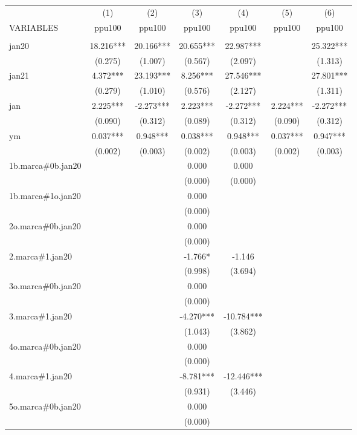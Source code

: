 \begin{tabular}{lcccccc} \hline
 & (1) & (2) & (3) & (4) & (5) & (6) \\
VARIABLES & ppu100 & ppu100 & ppu100 & ppu100 & ppu100 & ppu100 \\ \hline
 &  &  &  &  &  &  \\
jan20 & 18.216*** & 20.166*** & 20.655*** & 22.987*** &  & 25.322*** \\
 & (0.275) & (1.007) & (0.567) & (2.097) &  & (1.313) \\
jan21 & 4.372*** & 23.193*** & 8.256*** & 27.546*** &  & 27.801*** \\
 & (0.279) & (1.010) & (0.576) & (2.127) &  & (1.311) \\
jan & 2.225*** & -2.273*** & 2.223*** & -2.272*** & 2.224*** & -2.272*** \\
 & (0.090) & (0.312) & (0.089) & (0.312) & (0.090) & (0.312) \\
ym & 0.037*** & 0.948*** & 0.038*** & 0.948*** & 0.037*** & 0.947*** \\
 & (0.002) & (0.003) & (0.002) & (0.003) & (0.002) & (0.003) \\
1b.marca\#0b.jan20 &  &  & 0.000 & 0.000 &  &  \\
 &  &  & (0.000) & (0.000) &  &  \\
1b.marca\#1o.jan20 &  &  & 0.000 &  &  &  \\
 &  &  & (0.000) &  &  &  \\
2o.marca\#0b.jan20 &  &  & 0.000 &  &  &  \\
 &  &  & (0.000) &  &  &  \\
2.marca\#1.jan20 &  &  & -1.766* & -1.146 &  &  \\
 &  &  & (0.998) & (3.694) &  &  \\
3o.marca\#0b.jan20 &  &  & 0.000 &  &  &  \\
 &  &  & (0.000) &  &  &  \\
3.marca\#1.jan20 &  &  & -4.270*** & -10.784*** &  &  \\
 &  &  & (1.043) & (3.862) &  &  \\
4o.marca\#0b.jan20 &  &  & 0.000 &  &  &  \\
 &  &  & (0.000) &  &  &  \\
4.marca\#1.jan20 &  &  & -8.781*** & -12.446*** &  &  \\
 &  &  & (0.931) & (3.446) &  &  \\
5o.marca\#0b.jan20 &  &  & 0.000 &  &  &  \\
 &  &  & (0.000) &  &  &  \\

\end{tabular}
